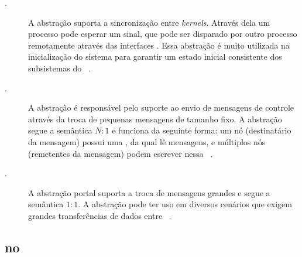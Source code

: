 \begin{description} 

    \item[\sync.] A abstração \sync suporta a sincronização entre \textit{kernels}. Através dela um processo pode esperar um sinal, que pode ser disparado por outro processo remotamente através das interfaces \noc. Essa abstração é muito utilizada na inicialização do sistema para garantir um estado inicial consistente dos subsistemas do \os~\cite{penna:thesis}.


%     

    \item[\mailbox.] A abstração \mailbox é responsável pelo suporte ao envio de mensagens de controle através da troca de pequenas mensagens de tamanho fixo. A abstração segue a semântica $N:1$ e funciona da seguinte forma: um nó (destinatário da mensagem) possui uma \mailbox, da qual lê mensagens, e múltiplos nós (remetentes da mensagem) podem escrever nessa \mailbox~\cite{penna:thesis}.

%     

\item[\portal.] A abstração portal suporta a troca de mensagens grandes e segue a semântica $1:1$. A abstração pode ter uso em diversos cenários que exigem grandes transferências de dados entre \clusters~\cite{penna:thesis}.
\end{description}

\subsection{\Tasks no \nanvix}

